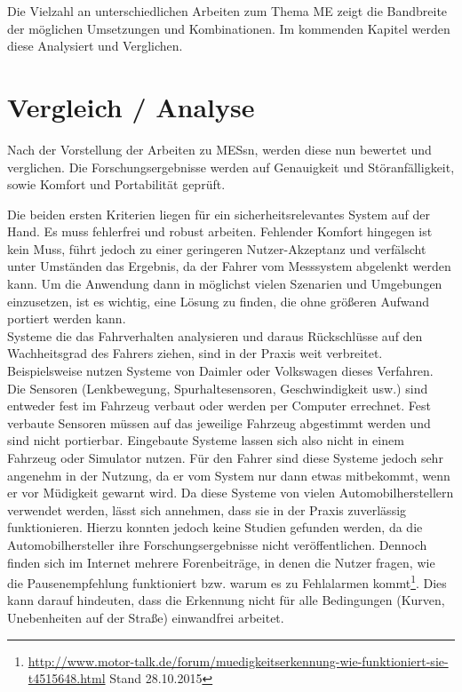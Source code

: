 {Die Vielzahl an unterschiedlichen Arbeiten zum Thema \acl{ME} zeigt die Bandbreite der möglichen Umsetzungen und Kombinationen. Im kommenden Kapitel werden diese Analysiert und Verglichen.

\section{Vergleich / Analyse}
\label{chap:an}
Nach der Vorstellung der Arbeiten zu \acl{MESs}n, werden diese nun bewertet und verglichen. Die Forschungsergebnisse werden auf Genauigkeit und Störanfälligkeit, sowie Komfort und Portabilität geprüft. 

Die beiden ersten Kriterien liegen für ein sicherheitsrelevantes System auf der Hand. Es muss fehlerfrei und robust arbeiten. Fehlender Komfort hingegen ist kein Muss, führt jedoch zu einer geringeren Nutzer-Akzeptanz und verfälscht unter Umständen das Ergebnis, da der Fahrer vom Messsystem abgelenkt werden kann. Um die Anwendung dann in möglichst vielen Szenarien und Umgebungen einzusetzen, ist es wichtig, eine Lösung zu finden, die ohne größeren Aufwand portiert werden kann. \\

Systeme die das Fahrverhalten analysieren und daraus Rückschlüsse auf den Wachheitsgrad des Fahrers ziehen, sind in der Praxis weit verbreitet. Beispielsweise nutzen Systeme von Daimler \cite{Daimler} oder Volkswagen \cite{Bosch} dieses Verfahren. Die Sensoren (Lenkbewegung, Spurhaltesensoren, Geschwindigkeit usw.) sind entweder fest im Fahrzeug verbaut oder werden per Computer errechnet. Fest verbaute Sensoren müssen auf das jeweilige Fahrzeug abgestimmt werden und sind nicht portierbar. Eingebaute Systeme lassen sich also nicht in einem Fahrzeug oder Simulator nutzen. Für den Fahrer sind diese Systeme jedoch sehr angenehm in der Nutzung, da er vom System nur dann etwas mitbekommt, wenn er vor Müdigkeit gewarnt wird. Da diese Systeme von vielen Automobilherstellern verwendet werden, lässt sich annehmen, dass sie in der Praxis zuverlässig funktionieren. Hierzu konnten jedoch keine Studien gefunden werden, da die Automobilhersteller ihre Forschungsergebnisse nicht veröffentlichen. Dennoch finden sich im Internet mehrere Forenbeiträge, in denen die Nutzer fragen, wie die Pausenempfehlung funktioniert bzw. warum es zu Fehlalarmen kommt\footnote{\url{http://www.motor-talk.de/forum/muedigkeitserkennung-wie-funktioniert-sie-t4515648.html} Stand 28.10.2015}. Dies kann darauf hindeuten, dass die Erkennung nicht für alle Bedingungen (Kurven, Unebenheiten auf der Straße) einwandfrei arbeitet. \\

}
